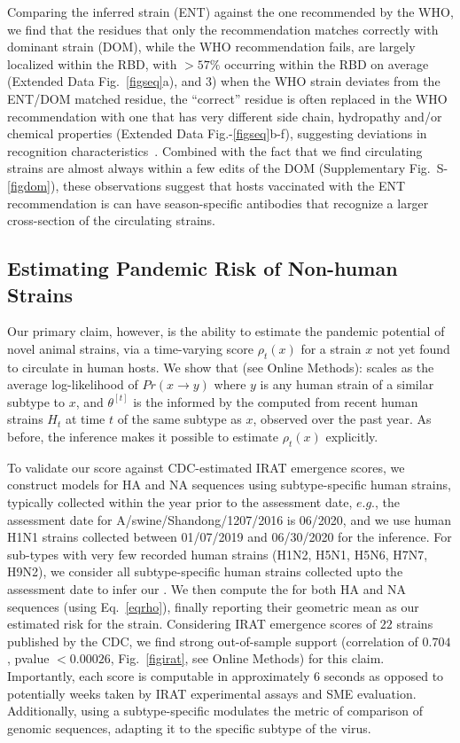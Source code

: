 \documentclass[onecolumn, compsoc,10pt]{IEEEtran}
\def\EXTENDED{Extended Data\xspace}
\def\SUPPLEMENTARY{Supplementary\xspace}
\def\METHODS{Online Methods\xspace}
\begin{document}
Comparing the \enet inferred strain (ENT) against the one recommended by the WHO, we find that the residues that only the  \enet recommendation matches correctly with dominant strain (DOM), while the WHO recommendation fails,  are largely localized within the RBD, with $>57\%$ occurring within  the RBD on average (\EXTENDED Fig.~\ref{figseq}a), and 3) when the WHO strain deviates from  the ENT/DOM   matched residue, the ``correct'' residue is often replaced  in the WHO recommendation with one that has very different side chain, hydropathy  and/or chemical properties (\EXTENDED Fig.-\ref{figseq}b-f), suggesting deviations in recognition characteristics~\cite{carugo2001normalized,righetto2014comparative}. Combined with the fact that we find circulating strains are almost always within a few edits of the DOM (\SUPPLEMENTARY Fig.~S-\ref{figdom}), these observations suggest that  hosts vaccinated with the ENT recommendation is can have season-specific antibodies that recognize a larger cross-section of the circulating strains.

\subsection*{Estimating Pandemic Risk of Non-human Strains}
Our primary claim, however,  is the ability to estimate the pandemic potential of novel animal strains, via a  time-varying \erisk score $\rho_t(x)$ for a strain $x$ not yet found to circulate in human hosts. We show that (see \METHODS):%
%
scales as the average log-likelihood of $Pr(x \rightarrow y)$ where $y$ is any human strain of a similar subtype to $x$, and  $\theta^{[t]}$ is the \qdist informed by the \enet computed from recent human strains $H_t$ at time $t$ of the same subtype as $x$, observed over the past year. As before, the \enet inference makes it possible to estimate $\rho_t(x)$ explicitly. 

To validate our score against CDC-estimated IRAT emergence scores, we construct \enet models for HA and NA sequences using subtype-specific human strains, typically collected within the  year prior to the assessment date, $e.g.$,  the  assessment date for A/swine/Shandong/1207/2016 is 06/2020, and  we  use human H1N1 strains collected  between 01/07/2019 and 06/30/2020 for the \enet inference. For sub-types with very few recorded human strains (H1N2, H5N1, H5N6, H7N7, H9N2), we consider all subtype-specific human strains collected upto the  assessment date  to infer our \enet. We then compute the \erisk for both HA and NA sequences (using Eq.~\eqref{eqrho}),  finally reporting their geometric mean as our estimated risk for the strain. Considering IRAT emergence scores of $22$ strains published by the CDC, we find strong out-of-sample support  (correlation of $0.704$, pvalue $<0.00026$, Fig.~\ref{figirat}, see \METHODS) for this claim. Importantly, each \erisk score  is  computable in approximately $6$ seconds as opposed to potentially weeks taken by IRAT experimental assays and SME evaluation. Additionally,  using a  subtype-specific \enet modulates the  metric of comparison of genomic sequences, adapting it to the specific subtype of the virus.
\end{document}
